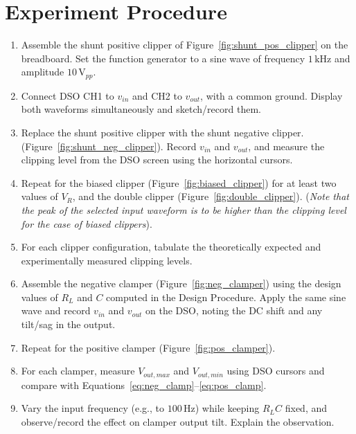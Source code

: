 \section{Experiment Procedure}

\begin{enumerate}[label=\arabic*.]
	\item Assemble the shunt positive clipper of Figure~\ref{fig:shunt_pos_clipper} on the breadboard. Set the function generator to a sine wave of frequency $1\,\text{kHz}$ and amplitude $10\,\text{V}_{pp}$. 
	\item Connect DSO CH1 to $v_{in}$ and CH2 to $v_{out}$, with a common ground. Display both waveforms simultaneously and sketch/record them.
	\item Replace the shunt positive clipper with the shunt negative clipper. (Figure~\ref{fig:shunt_neg_clipper}). Record $v_{in}$ and $v_{out}$, and measure the clipping level from the DSO screen using the horizontal cursors.
	\item Repeat for the biased clipper (Figure~\ref{fig:biased_clipper}) for at least two values of $V_R$, and the double clipper (Figure~\ref{fig:double_clipper}). (\emph{Note that the peak of the selected input waveform is to be higher than the clipping level for the case of biased clippers}).
	\item For each clipper configuration, tabulate the theoretically expected and experimentally measured clipping levels.
	\item Assemble the negative clamper (Figure~\ref{fig:neg_clamper}) using the design values of $R_L$ and $C$ computed in the Design Procedure. Apply the same sine wave and record $v_{in}$ and $v_{out}$ on the DSO, noting the DC shift and any tilt/sag in the output.
	\item Repeat for the positive clamper (Figure~\ref{fig:pos_clamper}).
	\item For each clamper, measure $V_{out,max}$ and $V_{out,min}$ using DSO cursors and compare with Equations~\eqref{eq:neg_clamp}--\eqref{eq:pos_clamp}.
	\item Vary the input frequency (e.g., to $100\,\text{Hz}$) while keeping $R_L C$ fixed, and observe/record the effect on clamper output tilt. Explain the observation.
\end{enumerate}

